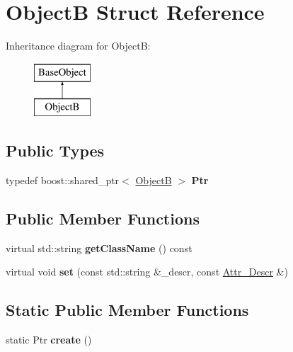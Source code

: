 \hypertarget{struct_object_b}{
\section{ObjectB Struct Reference}
\label{struct_object_b}
}
Inheritance diagram for ObjectB:\begin{figure}[H]
\begin{center}
\leavevmode
\includegraphics[height=2.000000cm]{struct_object_b}
\end{center}
\end{figure}
\subsection*{Public Types}
\begin{DoxyCompactItemize}
\item 
\hypertarget{struct_object_b_a4d11ff18fe2178ed5bec9474539f5641}{
typedef boost::shared\_\-ptr$<$ \hyperlink{struct_object_b}{ObjectB} $>$ {\bfseries Ptr}}
\label{struct_object_b_a4d11ff18fe2178ed5bec9474539f5641}

\end{DoxyCompactItemize}
\subsection*{Public Member Functions}
\begin{DoxyCompactItemize}
\item 
\hypertarget{struct_object_b_a736a840f3668a60413872ee51e96411d}{
virtual std::string {\bfseries getClassName} () const }
\label{struct_object_b_a736a840f3668a60413872ee51e96411d}

\item 
\hypertarget{struct_object_b_a35e51f9c71312ec9793ac39ace654902}{
virtual void {\bfseries set} (const std::string \&\_\-descr, const \hyperlink{struct_attr___descr}{Attr\_\-Descr} \&)}
\label{struct_object_b_a35e51f9c71312ec9793ac39ace654902}

\end{DoxyCompactItemize}
\subsection*{Static Public Member Functions}
\begin{DoxyCompactItemize}
\item 
\hypertarget{struct_object_b_a3f9d1754512a4336dcb6b12eb92c646a}{
static Ptr {\bfseries create} ()}
\label{struct_object_b_a3f9d1754512a4336dcb6b12eb92c646a}

\end{DoxyCompactItemize}
